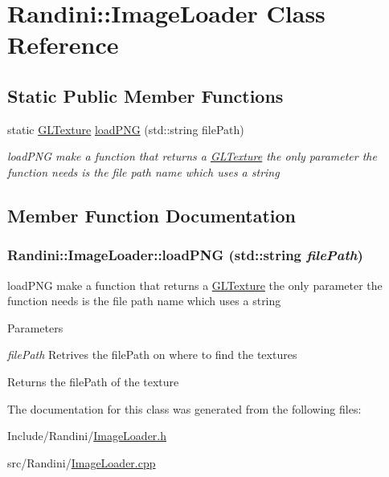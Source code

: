 \hypertarget{classRandini_1_1ImageLoader}{
\section{Randini::ImageLoader Class Reference}
\label{classRandini_1_1ImageLoader}
}
\subsection*{Static Public Member Functions}
\begin{DoxyCompactItemize}
\item 
static \hyperlink{structRandini_1_1GLTexture}{GLTexture} \hyperlink{classRandini_1_1ImageLoader_a9fcb5f4c32840bbd35f6f7d2850de900}{loadPNG} (std::string filePath)
\begin{DoxyCompactList}\small\item\em loadPNG make a function that returns a \hyperlink{structRandini_1_1GLTexture}{GLTexture} the only parameter the function needs is the file path name which uses a string \item\end{DoxyCompactList}\end{DoxyCompactItemize}


\subsection{Member Function Documentation}
\hypertarget{classRandini_1_1ImageLoader_a9fcb5f4c32840bbd35f6f7d2850de900}{
\subsubsection[{loadPNG}]{ Randini::ImageLoader::loadPNG (std::string {\em filePath})}}
\label{classRandini_1_1ImageLoader_a9fcb5f4c32840bbd35f6f7d2850de900}


loadPNG make a function that returns a \hyperlink{structRandini_1_1GLTexture}{GLTexture} the only parameter the function needs is the file path name which uses a string 
\begin{DoxyParams}{Parameters}
\item[{\em filePath}]Retrives the filePath on where to find the textures \end{DoxyParams}
\begin{DoxyReturn}{Returns}
the filePath of the texture 
\end{DoxyReturn}


The documentation for this class was generated from the following files:\begin{DoxyCompactItemize}
\item 
Include/Randini/\hyperlink{ImageLoader_8h}{ImageLoader.h}\item 
src/Randini/\hyperlink{ImageLoader_8cpp}{ImageLoader.cpp}\end{DoxyCompactItemize}
